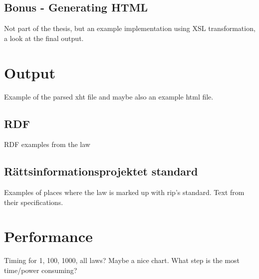 \subsection{Bonus - Generating HTML}
Not part of the thesis, but an example implementation using XSL transformation, a look at the final output. 


\section{Output}
Example of the parsed xht file and maybe also an example html file.
\subsection{RDF}
RDF examples from the law

\subsection{Rättsinformationsprojektet standard}
Examples of places where the law is marked up with rip's standard. 
Text from their specifications.

\section{Performance}
Timing for 1, 100, 1000, all laws? Maybe a nice chart. 
What step is the most time/power consuming?

